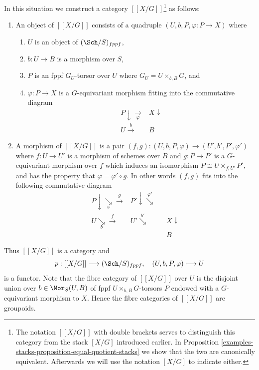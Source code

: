 In this situation we construct a category $[[X/G]]$\footnote{The notation
$[[X/G]]$ with double brackets serves to distinguish this category from
the stack $[X/G]$ introduced earlier. In
Proposition \ref{examples-stacks-proposition-equal-quotient-stacks}
we show that the two are canonically equivalent.
Afterwards we will use the notation $[X/G]$ to indicate either.} as follows:
\begin{enumerate}
\item An object of $[[X/G]]$ consists of a quadruple
$(U, b, P, \varphi : P \to X)$ where
\begin{enumerate}
\item $U$ is an object of $(\Sch/S)_{fppf}$,
\item $b : U \to B$ is a morphism over $S$,
\item $P$ is an fppf $G_U$-torsor over $U$ where $G_U = U \times_{b, B} G$, and
\item $\varphi : P \to X$ is a $G$-equivariant morphism fitting
into the commutative diagram
$$
\begin{array}{cc}P \downarrow\underset{\varphi}{\longrightarrow} & X \downarrow \\ U \overset{b}{\longrightarrow} & B\end{array}
$$
\end{enumerate}
\item A morphism of $[[X/G]]$ is a pair
$(f, g) : (U, b, P, \varphi) \to (U', b', P', \varphi')$
where $f : U \to U'$ is a morphism of schemes over $B$
and $g : P \to P'$ is a $G$-equivariant morphism over $f$
which induces an isomorphism $P \cong U \times_{f, U'} P'$, and has
the property that $\varphi = \varphi' \circ g$.
In other words $(f, g)$ fits into the following commutative
diagram
$$
\begin{array}{cccc}P \downarrow\underset{\varphi}{\searrow}\overset{g}{\longrightarrow} & P' \downarrow\overset{\varphi'}{\searrow} &  &  \\ U \underset{b}{\searrow}\overset{f}{\longrightarrow} & U' \overset{b'}{\searrow} &  & X \downarrow \\  &  &  & B\end{array}
$$
\end{enumerate}
Thus $[[X/G]]$ is a category and
$$
p : [[X/G]] \longrightarrow (\Sch/S)_{fppf},
\quad
(U, b, P, \varphi) \longmapsto U
$$
is a functor. Note that the fibre category of $[[X/G]]$
over $U$ is the disjoint union over $b \in \Mor_S(U, B)$
of fppf $U \times_{b, B} G$-torsors $P$ endowed with a $G$-equivariant
morphism to $X$. Hence the fibre categories of $[[X/G]]$ are groupoids.


